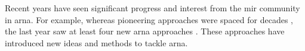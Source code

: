 

Recent years have seen significant progress and interest
from the \gls{mir} community in \gls{arna}. For example,
whereas pioneering approaches were spaced for decades
\parencite{winograd1968linguistics, maxwell1984artificial,
temperley1997algorithm}, the last year saw at least four new
\gls{arna} approaches \parencite{chen2021attend,
micchi2021deep, mcleod2021modular,
napoleslopez2021augmentednet}. These approaches have
introduced new ideas and methods to tackle \gls{arna}.
